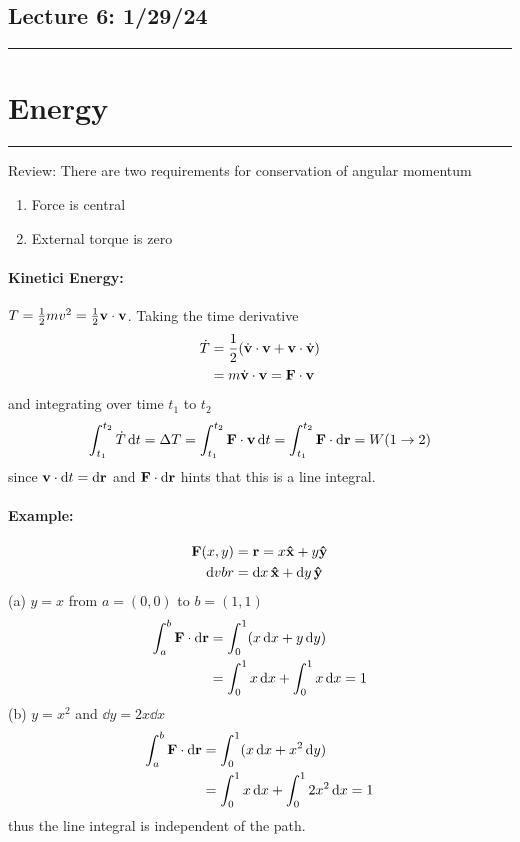 \documentclass[../main.tex]{subfiles}
\begin{document}
\pagebreak
\subsection*{Lecture 6: \hfill  1/29/24}
\hrule \vspace{10px}
\section{Energy}
\hrule \vspace{10px}

Review: There are two requirements for conservation of angular momentum
\begin{enumerate}
    \item Force is central
    \item External torque is zero
\end{enumerate}

\paragraph{Kinetici Energy:} $T = \frac{1}{2} m v^2 = \frac{1}{2} \vb{v} \cdot \vb{v}$. Taking the
time derivative
\begin{align*}
    \dot T &= \frac{1}{2} (\dot{\vb{v}} \cdot \vb{v} + \vb{v} \cdot \dot{\vb{v}}) \\
    &= m \dot{\vb{v}} \cdot \vb{v} = \vb{F} \cdot \vb{v}
\end{align*}
and integrating over time $t_1$ to $t_2$
\begin{align*}
    \int_{t_1}^{t_2} \dot T \dd{t} = \Delta T = \int_{t_1}^{t_2} \vb{F} \cdot \vb{v} \dd{t}
    = \int_{t_1}^{t_2} \vb{F} \cdot \dd{\vb{r}} = W(1 \to 2)
\end{align*}
since $\vb{v} \cdot \dd{t} = \dd{\vb{r}}$ and $\vb{F} \cdot \dd{\vb{r}}$ hints that this is a line
integral.

\paragraph{Example:}
\begin{align*}
    \vb{F}(x,y) &= \vb{r} = x \vu{x} + y \vu{y} \\
    \dd{vb{r}} &= \dd{x} \vu{x} + \dd{y} \vu{y}
\end{align*}
(a) $y = x$ from $a = (0,0)$ to $b = (1,1)$
\begin{align*}
    \int_a^b \vb{F} \cdot \dd{\vb{r}} &= \int_0^1 (x \dd{x} + y \dd{y}) \\
    &= \int_0^1 x \dd{x} + \int_0^1 x \dd{x} = 1
\end{align*}
(b) $y = x^2$ and $\dd{y} = 2x \dd{x}$
\begin{align*}
    \int_a^b \vb{F} \cdot \dd{\vb{r}} &= \int_0^1 (x \dd{x} + x^2 \dd{y}) \\
    &= \int_0^1 x \dd{x} + \int_0^1 2x^2 \dd{x} = 1
\end{align*}
thus the line integral is independent of the path.
\end{document}
